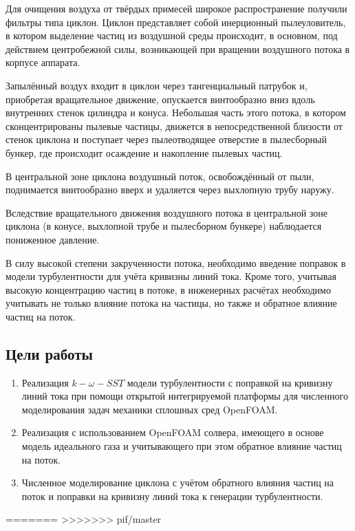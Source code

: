 		Для очищения воздуха от твёрдых примесей широкое распространение получили фильтры типа циклон. Циклон представляет собой инерционный пылеуловитель, в котором выделение частиц из воздушной среды происходит, в основном, под действием центробежной силы, возникающей при вращении воздушного потока в корпусе аппарата.
	
		Запылённый воздух входит в циклон через тангенциальный патрубок и, приобретая вращательное движение, опускается винтообразно вниз вдоль внутренних стенок цилиндра и конуса. Небольшая часть этого потока, в котором сконцентрированы пылевые частицы, движется в непосредственной близости от стенок циклона и поступает через пылеотводящее отверстие в пылесборный бункер, где происходит осаждение и накопление пылевых частиц.
	
		В центральной зоне циклона воздушный поток, освобождённый от пыли, поднимается винтообразно вверх и удаляется через выхлопную трубу наружу.
	
		Вследствие вращательного движения воздушного потока в центральной зоне циклона (в конусе, выхлопной трубе и пылесборном бункере) наблюдается пониженное давление.\cite{instructions}
	
		В силу высокой степени закрученности потока, необходимо введение поправок в модели турбулентности для учёта кривизны линий тока. Кроме того, учитывая высокую концентрацию частиц в потоке, в инженерных расчётах необходимо учитывать не только влияние потока на частицы, но также и обратное влияние частиц на поток.
	\newpage
	\subsection*{Цели работы}
		\begin{enumerate}
			\item Реализация $k-\omega-SST$ модели турбулентности с поправкой на кривизну линий тока при помощи открытой интегрируемой платформы для численного моделирования задач механики сплошных сред OpenFOAM.
			\item Реализация с использованием OpenFOAM солвера, имеющего в основе модель идеального газа и учитывающего при этом обратное влияние частиц на поток.
			\item Численное моделирование циклона с учётом обратного влияния частиц на поток и поправки на кривизну линий тока к генерации турбулентности.
		\end{enumerate}
=======
\cite{Alexander}
>>>>>>> pif/master
